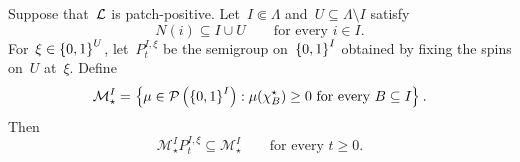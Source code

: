 \documentclass[EJP,preprint,NODS,nobera]{ejpecp}
\begin{document}
\begin{lemma}
\label{lem:boundary-moment-preservation}
Suppose that~$\mathcal{L}$ is patch-positive. Let~$I\Subset\Lambda$ and~$U\subseteq\Lambda\setminus I$ satisfy
\begin{equation*}
N(i)\subseteq I\cup U
\qquad
\text{for every }i\in I.
\end{equation*}
For~$\xi\in\left\{0,1\right\}^U$, let~$P_t^{I,\xi}$ be the semigroup on~$\left\{0,1\right\}^I$ obtained by fixing the spins on~$U$ at~$\xi$. Define
\begin{equation*}
\mathcal M_\star^I
=
\left\{
\mu\in\mathcal P\left(\left\{0,1\right\}^I\right):
\mu(\chi_B^\star)\geq0
\text{ for every }B\subseteq I
\right\}.
\end{equation*}
Then
\begin{equation*}
\mathcal M_\star^I P_t^{I,\xi}
\subseteq
\mathcal M_\star^I
\qquad
\text{for every }t\geq0.
\end{equation*}
\end{lemma}
\end{document}
